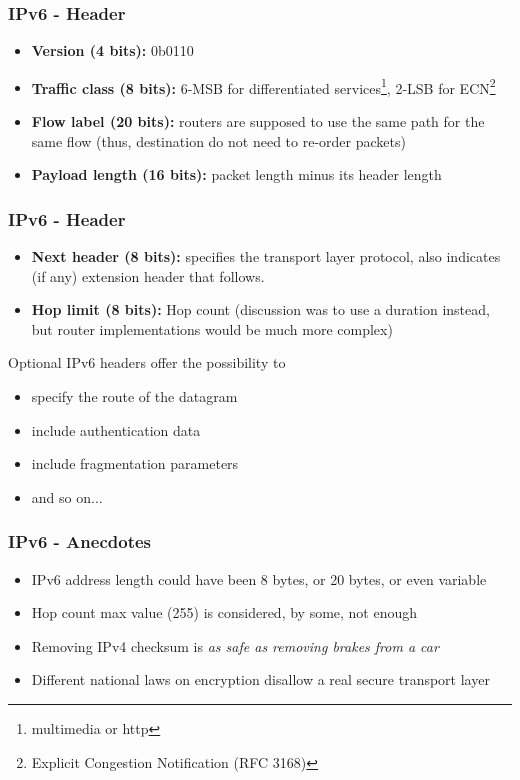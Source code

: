   \begin{frame}
    \frametitle{IPv6 - Header}
    \begin{itemize}
      \item \textbf{Version (4 bits):} 0b0110
      \item \textbf{Traffic class (8 bits):} 6-MSB for differentiated services\footnote{multimedia or http}, 2-LSB for ECN\footnote{Explicit Congestion Notification (RFC 3168)}
      \item \textbf{Flow label (20 bits):} routers are supposed to use the same path for the same flow (thus, destination do not need to re-order packets)
      \item \textbf{Payload length (16 bits):} packet length minus its header length
  \end{itemize}
  \end{frame}
    \begin{frame}
      \frametitle{IPv6 - Header}
      \begin{itemize}
          \item \textbf{Next header (8 bits):} specifies the transport layer protocol, also indicates (if any) extension header that follows.
          \item \textbf{Hop limit (8 bits):} Hop count (discussion was to use a duration instead, but router implementations would be much more complex)
    \end{itemize}
    \begin{block}{Optional IPv6 headers offer the possibility to}
        \begin{itemize}
            \item specify the route of the datagram
            \item include authentication data
            \item include fragmentation parameters
            \item and so on...
        \end{itemize}
    \end{block}
  \end{frame}
    \begin{frame}
      \frametitle{IPv6 - Anecdotes}
      \begin{itemize}
        \item IPv6 address length could have been 8 bytes, or 20 bytes, or even variable
        \item Hop count max value (255) is considered, by some, not enough
        \item Removing IPv4 checksum is \emph{as safe as removing brakes from a car}
        \item Different national laws on encryption disallow a real secure transport layer
    \end{itemize}
    \end{frame}

